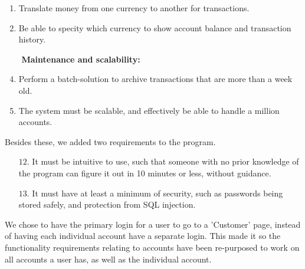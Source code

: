 \begin{mdframed}[backgroundcolor=black!5]
\begin{enumerate}
\item Translate money from one currency to another for transactions.

\item Be able to specity which currency to show account balance and transaction history.

\item[$ $] \textbf{Maintenance and scalability:}

\item Perform a batch-solution to archive transactions that are more than a week old.

\item The system must be scalable, and effectively be able to handle a million accounts.
\end{enumerate}

\end{mdframed}

Besides these, we added two requirements to the program.

\begin{enumerate}
    \item[$12.$] It must be intuitive to use, such that someone with no prior knowledge of the program can figure it out in 10 minutes or less, without guidance.
    \item[$13.$] It must have at least a minimum of security, such as passwords being stored safely, and protection from SQL injection.
\end{enumerate}


We chose to have the primary login for a user to go to a 'Customer' page, instead of having each individual account have a separate login. This made it so the functionality requirements relating to accounts have been re-purposed to work on all accounts a user has, as well as the individual account. 

